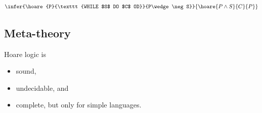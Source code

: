 \documentclass{article}
\begin{document}
\begin{definition}
	\begin{align*}
		\infer{\hoare{P}{\texttt{WHILE $S$ DO $C$ OD}}{P\wedge\neg S}}{\hoare{P\wedge S}{C}{P}}
	\end{align*}
\end{definition}

\subsection{Meta-theory}

\begin{theorem}
	Hoare logic is
	\begin{itemize}
		\item sound,
		\item undecidable, and
		\item complete, but only for simple languages.
	\end{itemize}
\end{theorem}
\end{document}

